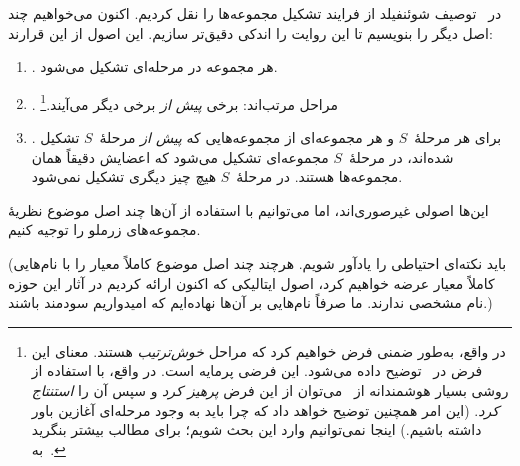 \documentclass[../../../include/open-logic-section]{subfiles}
\begin{document}
	
در~ توصیف شوئنفیلد از فرایند تشکیل مجموعه‌ها را
نقل کردیم. اکنون می‌خواهیم چند اصل دیگر را بنویسیم تا این روایت را اندکی
دقیق‌تر سازیم. این اصول از این قرارند:
\begin{enumerate}
\item[] \stageshier. هر مجموعه در مرحله‌ای تشکیل می‌شود.
\item[] \stagesord. مراحل مرتب‌اند: برخی \emph{پیش از} برخی دیگر
می‌آیند.\footnote{در واقع، به‌طور ضمنی فرض خواهیم کرد که مراحل
\emph{خوش‌ترتیب} هستند. معنای این فرض در~ توضیح
داده می‌شود. این فرضی پرمایه است. در واقع، با استفاده از روشی بسیار
هوشمندانه از~\citet{Scott1974} می‌توان از این فرض \emph{پرهیز کرد} و سپس
آن را \emph{استنتاج کرد}. (این امر همچنین توضیح خواهد داد که چرا باید به
وجود مرحله‌ای آغازین باور داشته باشیم.) اینجا نمی‌توانیم وارد این بحث
شویم؛ برای مطالب بیشتر بنگرید به~\citet{ButtonLT1}.}
\item[] \stagesacc. برای هر مرحلهٔ~$S$ و هر مجموعه‌ای از مجموعه‌هایی که
\emph{پیش از} مرحلهٔ~$S$ تشکیل شده‌اند، در مرحلهٔ~$S$ مجموعه‌ای تشکیل
می‌شود که اعضایش دقیقاً همان مجموعه‌ها هستند. در مرحلهٔ~$S$ هیچ چیز دیگری
تشکیل نمی‌شود.
\end{enumerate}
این‌ها اصولی غیرصوری‌اند، اما می‌توانیم با استفاده از آن‌ها چند اصل موضوع
نظریهٔ مجموعه‌های زرملو را توجیه کنیم.

(باید نکته‌ای احتیاطی را یادآور شویم. هرچند چند اصل موضوع کاملاً معیار را
با نام‌هایی کاملاً معیار عرضه خواهیم کرد، اصول ایتالیکی که اکنون ارائه
کردیم در آثار این حوزه نام مشخصی ندارند. ما صرفاً نام‌هایی بر آن‌ها
نهاده‌ایم که امیدواریم سودمند باشند.)
\end{document}
